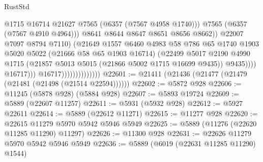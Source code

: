 \begin{lexlean}{RustStd}
\begin{coremodule}
                                                    @1715
                                                    @16714
                                                    @21627
                                                    @7565
                                                    (@6357 (@7567 @4958 @1740)))
                                                  @7565
                                                  (@6357 (@7567 @4910 @4964)))
                                                @8641
                                                @8644
                                                @8647
                                                @8651
                                                @8656
                                                @8662))
                                            @22007
                                            @7097
                                            @8794
                                            @7110)
                                          (@21649
                                            @1557
                                            @6460
                                            @4983
                                            @58
                                            @786
                                            @65
                                            @1740
                                            @1903
                                            @5020
                                            @5022
                                            (@21666 @58 @65 @1903 @16714)
                                            (@22499
                                              @5017
                                              @2190
                                              @4990
                                              @1715
                                              (@21857 @5013 @5015 (@21866 @5002 @1715 @16699 @9435))
                                              @9435))))
                                      @16717)))
                                @16717))))))))))))))
@22601 := @21411 (@21436 (@21477 (@21479 (@21481 (@21498 (@21514 @22594))))))
@22602 := @5872 @928
@22606 := @11245 (@5878 @928) (@5884 @928)
@22607 := @5893 @19724
@22609 := @5889 (@22607 @11257)
@22611 := @5931 (@5932 @928)
@22612 := @5927 @22611
@22614 := @5889 (@22612 @11271)
@22615 := @11277 @928
@22620 := @22615 @11279 @5970 @5942 @5946 @5949
@22625 := @5889 (@11276 (@22620 @11285 @11290) @11297)
@22626 := @11300 @928
@22631 := @22626 @11279 @5970 @5942 @5946 @5949
@22636 := @5889 (@6019 (@22631 @11285 @11290) @1544)

\end{coremodule}
\end{lexlean}
